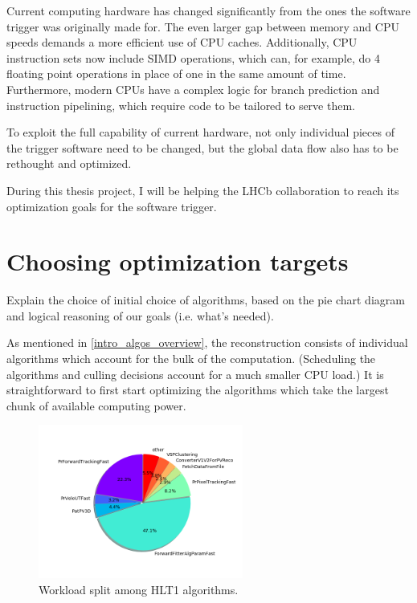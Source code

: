 \documentclass[12pt]{article}
\begin{document}
Current computing hardware has changed significantly from the ones the software trigger was originally made for. The even larger gap between memory and CPU speeds demands a more efficient use of CPU caches. Additionally, CPU instruction sets now include SIMD operations, which can, for example, do 4 floating point operations in place of one in the same amount of time. Furthermore, modern CPUs have a complex logic for branch prediction and instruction pipelining, which require code to be tailored to serve them.

To exploit the full capability of current hardware, not only individual pieces of the trigger software need to be changed, but the global data flow also has to be rethought and optimized.

During this thesis project, I will be helping the LHCb collaboration to reach its optimization goals for the software trigger.

\newpage
\section{Choosing optimization targets}

\color{red}
Explain the choice of initial choice of algorithms, based on the pie chart diagram and logical reasoning of our goals (i.e. what's needed).
\color{black}

As mentioned in \ref{intro_algos_overview}, the reconstruction consists of individual algorithms which account for the bulk of the computation. (Scheduling the algorithms and culling decisions account for a much smaller CPU load.) It is straightforward to first start optimizing the algorithms which take the largest chunk of available computing power.

\begin{figure}[H]
	\begin{center}
		\includegraphics[width=0.6\textwidth]{algo_usage_original_bestphys}
	\end{center}
	\caption{Workload split among HLT1 algorithms.}
	\label{fig_algo_usage_choice}
\end{figure}
\end{document}
